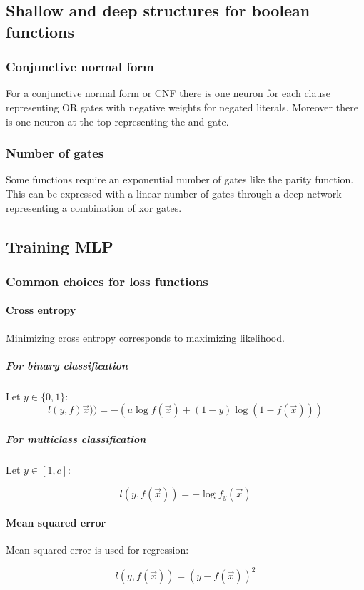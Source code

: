 	\subsection{Shallow and deep structures for boolean functions}

		\subsubsection{Conjunctive normal form}
		For a conjunctive normal form or CNF there is one neuron for each clause representing OR gates with negative weights for negated literals.
		Moreover there is one neuron at the top representing the and gate.

		\subsubsection{Number of gates}
		Some functions require an exponential number of gates like the parity function.
		This can be expressed with a linear number of gates through a deep network representing a combination of xor gates.

	\subsection{Training MLP}

		\subsubsection{Common choices for loss functions}

			\paragraph{Cross entropy}
			Minimizing cross entropy corresponds to maximizing likelihood.

				\subparagraph{For binary classification}
				Let $y\in\{0,1\}$:
				$$l(y, f)\vec{x})) = -(u\log f(\vec{x}) + (1-y)\log(1-f(\vec{x})))$$

				\subparagraph{For multiclass classification}
				Let $y\in[1,c]$:

				$$l(y,f(\vec{x})) = -\log f_y(\vec{x})$$

			\paragraph{Mean squared error}
			Mean squared error is used for regression:

			$$l(y,f(\vec{x})) = (y-f(\vec{x}))^2$$

